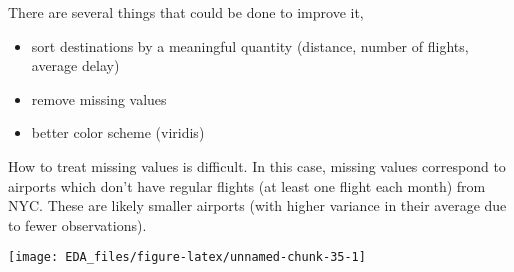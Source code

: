 \documentclass[]{book}
\newenvironment{Shaded}{\begin{snugshade}}{\end{snugshade}}
\newcommand{\DataTypeTok}[1]{\textcolor[rgb]{0.13,0.29,0.53}{#1}}
\newcommand{\DecValTok}[1]{\textcolor[rgb]{0.00,0.00,0.81}{#1}}
\newcommand{\KeywordTok}[1]{\textcolor[rgb]{0.13,0.29,0.53}{\textbf{#1}}}
\newcommand{\NormalTok}[1]{#1}
\newcommand{\OperatorTok}[1]{\textcolor[rgb]{0.81,0.36,0.00}{\textbf{#1}}}
\newcommand{\OtherTok}[1]{\textcolor[rgb]{0.56,0.35,0.01}{#1}}
\newcommand{\StringTok}[1]{\textcolor[rgb]{0.31,0.60,0.02}{#1}}
\providecommand{\tightlist}{%
  \setlength{\itemsep}{0pt}\setlength{\parskip}{0pt}}
\theoremstyle{plain}
\theoremstyle{remark}
\theoremstyle{definition}
\theoremstyle{definition}
\theoremstyle{definition}
\theoremstyle{remark}
\begin{document}
There are several things that could be done to improve it,

\begin{itemize}
\tightlist
\item
  sort destinations by a meaningful quantity (distance, number of
  flights, average delay)
\item
  remove missing values
\item
  better color scheme (viridis)
\end{itemize}

How to treat missing values is difficult. In this case, missing values
correspond to airports which don't have regular flights (at least one
flight each month) from NYC. These are likely smaller airports (with
higher variance in their average due to fewer observations).

\begin{Shaded}
\end{Shaded}

\begin{center}\texttt{[image: EDA\_files/figure-latex/unnamed-chunk-35-1]} \end{center}
\end{document}
